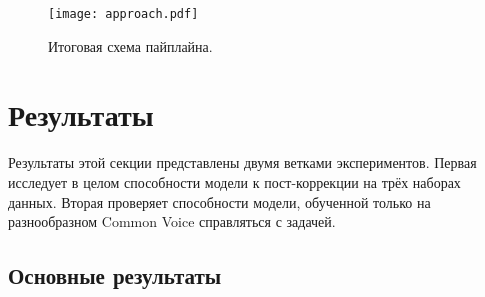 \begin{figure}[!t]
  \centering
  \texttt{[image: approach.pdf]}
  \caption{Итоговая схема пайплайна.}
  \label{fig:approach}
\end{figure}

\section{Результаты}

Результаты этой секции представлены двумя ветками экспериментов.
Первая исследует в целом способности модели к пост-коррекции на трёх наборах данных.
Вторая проверяет способности модели, обученной только на разнообразном Common Voice справляться с задачей.

\subsection{Основные результаты}
